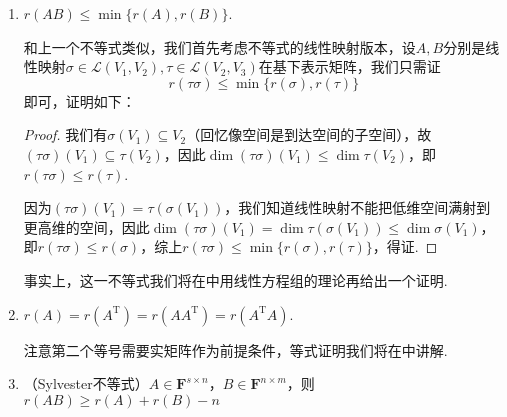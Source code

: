 \begin{enumerate}
\begin{proof}
              下面我们证明$r(A+B)\leqslant r(A)+r(B)$，这里我们站在线性映射的角度证明（事实上接下来第3、5个不等式也是如此，主要思路与教材3.4节一致）. 设$A,B$分别是线性映射$\sigma,\tau\in\mathcal{L}(V_1,V_2)$在基下表示矩阵. 事实上，矩阵的秩的定义就来源于线性映射的秩，即$r(A)=r(\sigma)$，$r(B)=r(\tau)$，因此我们只需要证明
              \[r(\sigma+\tau)\leqslant r(\sigma)+r(\tau),\]
              又根据线性映射的秩的定义，只需证明
              \[\dim(\sigma+\tau)(V_1)\leqslant \dim\sigma(V_1)+\dim\tau(V_1),\]
              事实上，$\forall\beta\in(\sigma+\tau)(V_1)$，$\exists\alpha\in V_1$，使得$\beta=(\sigma+\tau)\alpha=\sigma(\alpha)+\tau(\alpha)\in\sigma(V_1)+\tau(V_1)$，因此$(\sigma+\tau)(V_1)\subseteq\sigma(V_1)+\tau(V_1)$，故$\dim(\sigma+\tau)(V_1)\leqslant \dim(\sigma(V_1)+\tau(V_1))\leqslant \dim\sigma(V_1)+\dim\tau(V_1)$，得证（最后一个不等号来源于）.
          \end{proof}

    \item $r(AB) \leqslant \min\{r(A), r(B)\}$.

          和上一个不等式类似，我们首先考虑不等式的线性映射版本，设$A,B$分别是线性映射$\sigma\in\mathcal{L}(V_1,V_2),\tau\in\mathcal{L}(V_2,V_3)$在基下表示矩阵，我们只需证
          \[r(\tau\sigma)\leqslant \min\{r(\sigma), r(\tau)\}\]
          即可，证明如下：

          \begin{proof}
              我们有$\sigma(V_1)\subseteq V_2$（回忆像空间是到达空间的子空间），故$(\tau\sigma)(V_1)\subseteq\tau(V_2)$，因此$\dim(\tau\sigma)(V_1)\leqslant\dim\tau(V_2)$，即$r(\tau\sigma)\leqslant r(\tau)$.

              因为$(\tau\sigma)(V_1)=\tau(\sigma(V_1))$，我们知道线性映射不能把低维空间满射到更高维的空间，因此$\dim(\tau\sigma)(V_1)=\dim\tau(\sigma(V_1))\leqslant\dim\sigma(V_1)$，即$r(\tau\sigma)\leqslant r(\sigma)$，综上$r(\tau\sigma)\leqslant \min\{r(\sigma), r(\tau)\}$，得证.
          \end{proof}

          事实上，这一不等式我们将在中用线性方程组的理论再给出一个证明.

    \item $r(A)=r(A^\mathrm{T})=r(AA^\mathrm{T})=r(A^\mathrm{T}A)$.

          注意第二个等号需要实矩阵作为前提条件，等式证明我们将在中讲解.

    \item （Sylvester不等式）$A \in \mathbf{F}^{s \times n}$，$B \in \mathbf{F}^{n \times m}$，则$r(AB) \geqslant r(A)+r(B)-n$


\end{enumerate}
